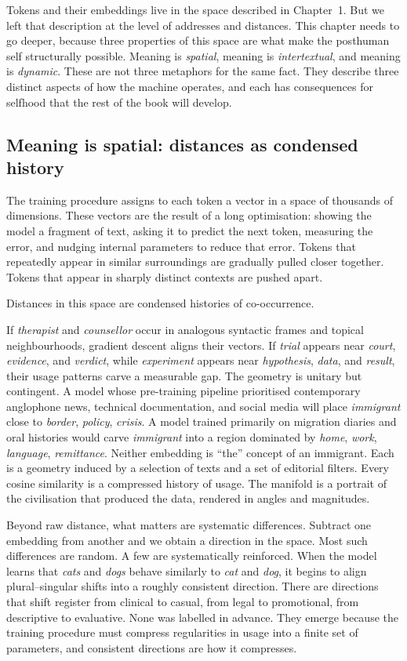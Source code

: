 Tokens and their embeddings live in the space described in Chapter~1. But we left that description at the level of addresses and distances. This chapter needs to go deeper, because three properties of this space are what make the posthuman self structurally possible. Meaning is \emph{spatial}, meaning is \emph{intertextual}, and meaning is \emph{dynamic}. These are not three metaphors for the same fact. They describe three distinct aspects of how the machine operates, and each has consequences for selfhood that the rest of the book will develop.

\subsection{Meaning is spatial: distances as condensed history}

The training procedure assigns to each token a vector in a space of thousands of dimensions. These vectors are the result of a long optimisation: showing the model a fragment of text, asking it to predict the next token, measuring the error, and nudging internal parameters to reduce that error. Tokens that repeatedly appear in similar surroundings are gradually pulled closer together. Tokens that appear in sharply distinct contexts are pushed apart.

Distances in this space are condensed histories of co-occurrence.

If \emph{therapist} and \emph{counsellor} occur in analogous syntactic frames and topical neighbourhoods, gradient descent aligns their vectors. If \emph{trial} appears near \emph{court}, \emph{evidence}, and \emph{verdict}, while \emph{experiment} appears near \emph{hypothesis}, \emph{data}, and \emph{result}, their usage patterns carve a measurable gap. The geometry is unitary but contingent. A model whose pre-training pipeline prioritised contemporary anglophone news, technical documentation, and social media will place \emph{immigrant} close to \emph{border}, \emph{policy}, \emph{crisis}. A model trained primarily on migration diaries and oral histories would carve \emph{immigrant} into a region dominated by \emph{home}, \emph{work}, \emph{language}, \emph{remittance}. Neither embedding is ``the'' concept of an immigrant. Each is a geometry induced by a selection of texts and a set of editorial filters. Every cosine similarity is a compressed history of usage. The manifold is a portrait of the civilisation that produced the data, rendered in angles and magnitudes.

Beyond raw distance, what matters are systematic differences. Subtract one embedding from another and we obtain a direction in the space. Most such differences are random. A few are systematically reinforced. When the model learns that \emph{cats} and \emph{dogs} behave similarly to \emph{cat} and \emph{dog}, it begins to align plural--singular shifts into a roughly consistent direction. There are directions that shift register from clinical to casual, from legal to promotional, from descriptive to evaluative. None was labelled in advance. They emerge because the training procedure must compress regularities in usage into a finite set of parameters, and consistent directions are how it compresses.


